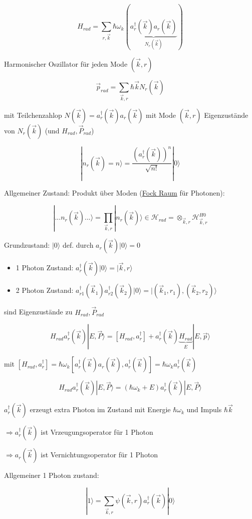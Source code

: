 \[\boxed{H_{rad} = \sum_{r,\vec k} \hbar\omega_k(\underbrace{a_r^\dagger (\vec k)a_r(\vec k)}_{N_r(\vec k)}) } \]

Harmonischer Oszillator für jeden Mode \((\vec k,r)\)

\[\vec p_{rad} = \sum_{\vec k,r} \hbar\vec k N_r(\vec k)\]

mit Teilchenzahlop \(N(\vec k) = a^\dagger_r(\vec k)a_r(\vec k)\) mit Mode \((\vec k,r)\) Eigenzustände von \(N_r(\vec k)\) (und \(H_{rad},\vec P_{rad}\))

\[|n_r(\vec k)=n\rangle  = \frac{(a^\dagger_r(\vec k))^n}{\sqrt{n!}}|0\rangle \]


Allgemeiner Zustand: Produkt über Moden (\underline{Fock Raum} für Photonen):

\[|... n_r(\vec k)...\rangle  = \prod_{\vec k,r}|n_r(\vec k)\rangle \in \mathcal H_{rad} = \otimes_{\vec k,r}\mathcal H_{\vec k,r}^{H0}\]

Grundzustand: \(|0\rangle \) def. durch \(a_r(\vec k)|0\rangle =0\)

\begin{itemize}
\item 1 Photon Zustand: \(a^\dagger_r(\vec k) |0\rangle = |\vec k,r\rangle  \)
\item 2 Photon Zustand: \(a^\dagger_{r1} (\vec k_1) a^\dagger_{r2} (\vec k_2)   |0\rangle = |(\vec k_1,r_1),(\vec k_2,r_2)\rangle   \)
\end{itemize}

sind Eigenzustände zu \(H_{rad},\vec P_{rad}\)

\[ H_{rad}a^\dagger_r(\vec k) |E,\vec P\rangle  =  [H_{rad},a^\dagger_r]+a^\dagger_r(\vec k)\underbrace{H_{rad}}_{E}|E,\vec p\rangle \]


mit \([H_{rad},a^\dagger_r] = \hbar\omega_k[a^\dagger_r(\vec k) a_r(\vec k),a^\dagger_r(\vec k)] =\hbar\omega_k a^\dagger_r(\vec k)  \)

\[ H_{rad}a^\dagger_r(\vec k) |E,\vec P\rangle  = (\hbar\omega_k+E) a^\dagger_r(\vec k)|E,\vec P\rangle  \]

\( a^\dagger_r(\vec k) \) erzeugt extra Photon im Zustand mit Energie \(\hbar\omega_k\) und Impuls \(\hbar \vec k\)

\(\Rightarrow  a^\dagger_r(\vec k) \) ist Vrzeugungsoperator für 1 Photon

\(\Rightarrow  a_r(\vec k) \) ist Vernichtungsoperator für 1 Photon


Allgemeiner 1 Photon zustand:

\[|1\rangle  = \sum_{\vec k,r}\psi(\vec k,r)a^\dagger_r(\vec k)|0\rangle \]

